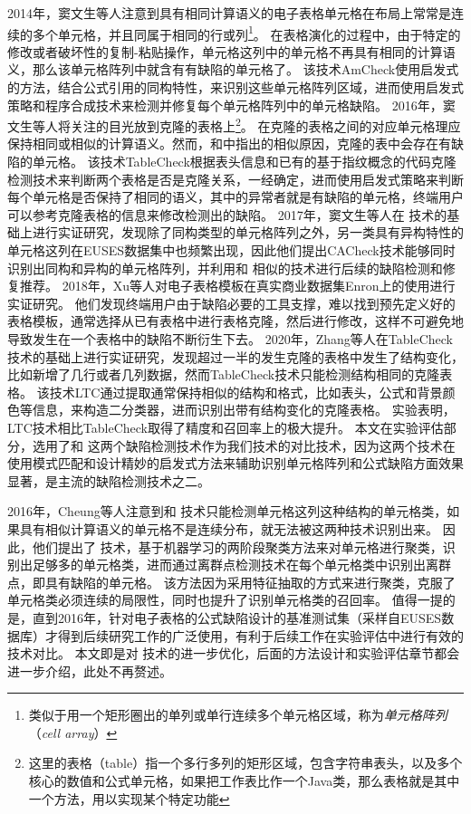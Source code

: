 2014年，窦文生等人\cite{dou2014spreadsheet}注意到具有相同计算语义的电子表格单元格在布局上常常是连续的多个单元格，并且同属于相同的行或列\footnote{类似于用一个矩形圈出的单列或单行连续多个单元格区域，称为\textit{单元格阵列}（\textit{cell array}）}。
在表格演化的过程中，由于特定的修改或者破坏性的复制-粘贴操作，单元格这列中的单元格不再具有相同的计算语义，那么该单元格阵列中就含有有缺陷的单元格了。
该技术AmCheck使用启发式的方法，结合公式引用的同构特性，来识别这些单元格阵列区域，进而使用启发式策略和程序合成技术来检测并修复每个单元格阵列中的单元格缺陷。
2016年，窦文生等人\cite{dou2016detecting}将关注的目光放到克隆的表格上\footnote{这里的表格（table）指一个多行多列的矩形区域，包含字符串表头，以及多个核心的数值和公式单元格，如果把工作表比作一个Java类，那么表格就是其中一个方法，用以实现某个特定功能}。
在克隆的表格之间的对应单元格理应保持相同或相似的计算语义。然而，和\cite{dou2014spreadsheet}中指出的相似原因，克隆的表中会存在有缺陷的单元格。
该技术TableCheck根据表头信息和已有的基于指纹概念的代码克隆检测技术来判断两个表格是否是克隆关系，一经确定，进而使用启发式策略来判断每个单元格是否保持了相同的语义，其中的异常者就是有缺陷的单元格，终端用户可以参考克隆表格的信息来修改检测出的缺陷。
2017年，窦文生等人\cite{dou2017cacheck}在 \am 技术的基础上进行实证研究，发现除了同构类型的单元格阵列之外，另一类具有异构特性的单元格这列在EUSES数据集中也频繁出现，因此他们提出CACheck技术能够同时识别出同构和异构的单元格阵列，并利用和 \am 相似的技术进行后续的缺陷检测和修复推荐。
2018年，Xu等人\cite{xu2018spreadsheet}对电子表格模板在真实商业数据集Enron上的使用进行实证研究。
他们发现终端用户由于缺陷必要的工具支撑，难以找到预先定义好的表格模板，通常选择从已有表格中进行表格克隆，然后进行修改，这样不可避免地导致发生在一个表格中的缺陷不断衍生下去。
2020年，Zhang等人\cite{zhang2020learning}在TableCheck技术的基础上进行实证研究，发现超过一半的发生克隆的表格中发生了结构变化，比如新增了几行或者几列数据，然而TableCheck技术只能检测结构相同的克隆表格。
该技术LTC通过提取通常保持相似的结构和格式，比如表头，公式和背景颜色等信息，来构造二分类器，进而识别出带有结构变化的克隆表格。
实验表明，LTC技术相比TableCheck取得了精度和召回率上的极大提升。
本文在实验评估部分，选用了\am 和 \ca 这两个缺陷检测技术作为我们\wa 技术的对比技术，因为这两个技术在使用模式匹配和设计精妙的启发式方法来辅助识别单元格阵列和公式缺陷方面效果显著，是主流的缺陷检测技术之二。

2016年，Cheung等人\cite{cheung2016custodes}注意到\am 和 \ca 技术只能检测单元格这列这种结构的单元格类，如果具有相似计算语义的单元格不是连续分布，就无法被这两种技术识别出来。
因此，他们提出了 \cu 技术，基于机器学习的两阶段聚类方法来对单元格进行聚类，识别出足够多的单元格类，进而通过离群点检测技术在每个单元格类中识别出离群点，即具有缺陷的单元格。
该方法因为采用特征抽取的方式来进行聚类，克服了单元格类必须连续的局限性，同时也提升了识别单元格类的召回率。
值得一提的是，直到2016年，针对电子表格的公式缺陷设计的基准测试集（采样自EUSES数据库）才得到后续研究工作的广泛使用，有利于后续工作\cite{singh2017melford,Barowy2018excelint}在实验评估中进行有效的技术对比。
本文即是对 \cu 技术的进一步优化，后面的方法设计和实验评估章节都会进一步介绍，此处不再赘述。

